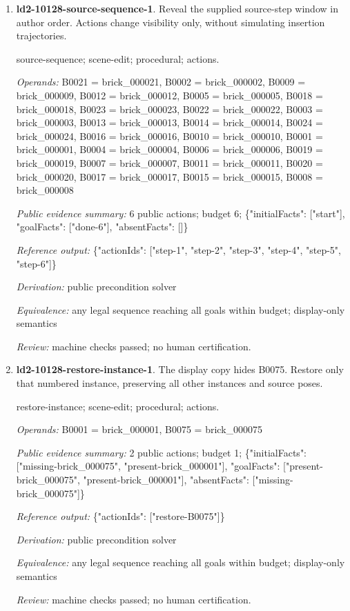 \begin{enumerate}
\item \textbf{ld2-10128-source-sequence-1}. Reveal the supplied source-step window in author order. Actions change visibility only, without simulating insertion trajectories.
\par{\small source-sequence; scene-edit; procedural; actions.\par\textit{Operands:} B0021 = brick\_000021, B0002 = brick\_000002, B0009 = brick\_000009, B0012 = brick\_000012, B0005 = brick\_000005, B0018 = brick\_000018, B0023 = brick\_000023, B0022 = brick\_000022, B0003 = brick\_000003, B0013 = brick\_000013, B0014 = brick\_000014, B0024 = brick\_000024, B0016 = brick\_000016, B0010 = brick\_000010, B0001 = brick\_000001, B0004 = brick\_000004, B0006 = brick\_000006, B0019 = brick\_000019, B0007 = brick\_000007, B0011 = brick\_000011, B0020 = brick\_000020, B0017 = brick\_000017, B0015 = brick\_000015, B0008 = brick\_000008\par\textit{Public evidence summary:} 6 public actions; budget 6; \{"initialFacts": ["start"], "goalFacts": ["done-6"], "absentFacts": []\}\par\textit{Reference output:} \{"actionIds": ["step-1", "step-2", "step-3", "step-4", "step-5", "step-6"]\}\par\textit{Derivation:} public precondition solver\par\textit{Equivalence:} any legal sequence reaching all goals within budget; display-only semantics\par\textit{Review:} machine checks passed; no human certification.}
\item \textbf{ld2-10128-restore-instance-1}. The display copy hides B0075. Restore only that numbered instance, preserving all other instances and source poses.
\par{\small restore-instance; scene-edit; procedural; actions.\par\textit{Operands:} B0001 = brick\_000001, B0075 = brick\_000075\par\textit{Public evidence summary:} 2 public actions; budget 1; \{"initialFacts": ["missing-brick\_000075", "present-brick\_000001"], "goalFacts": ["present-brick\_000075", "present-brick\_000001"], "absentFacts": ["missing-brick\_000075"]\}\par\textit{Reference output:} \{"actionIds": ["restore-B0075"]\}\par\textit{Derivation:} public precondition solver\par\textit{Equivalence:} any legal sequence reaching all goals within budget; display-only semantics\par\textit{Review:} machine checks passed; no human certification.}

\end{enumerate}
